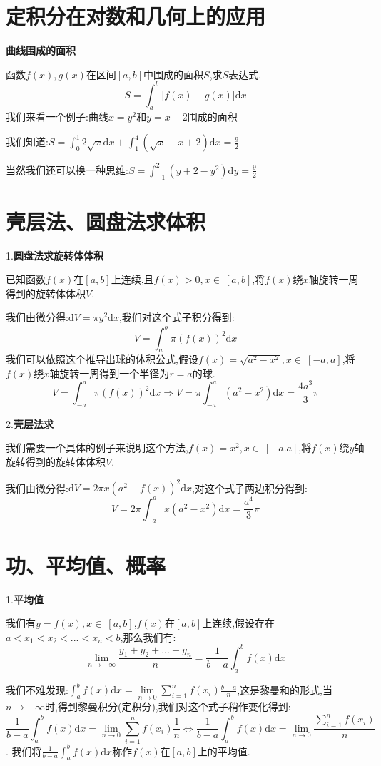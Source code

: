\documentclass[oneside]{book}
\begin{document}
	\chapter{定积分在对数和几何上的应用}
	\textbf{曲线围成的面积}
	
	函数$f(x),g(x)$在区间$[a,b]$中围成的面积$S$,求$S$表达式.
	$$S=\int_{a}^{b}|f(x)-g(x)|\mathrm{d}x$$
	我们来看一个例子:曲线$x=y^{2}$和$y=x-2$围成的面积
	
	我们知道:$S=\int_{0}^{1}2\sqrt{x}\mathrm{d}x+\int_{1}^{4}(\sqrt{x}-x+2)\mathrm{d}x=\frac{9}{2}$
	
	当然我们还可以换一种思维:$S=\int_{-1}^{2}(y+2-y^{2})\mathrm{d}y=\frac{9}{2}$
	\chapter{壳层法、圆盘法求体积}
	1.\textbf{圆盘法求旋转体体积}
	
	已知函数$f(x)$在$[a,b]$上连续,且$f(x)>0,x\in \ [a,b]$,将$f(x)$绕$x$轴旋转一周得到的旋转体体积$V$.
	
	我们由微分得:$\mathrm{d}V=\pi y^{2}\mathrm{d}x$,我们对这个式子积分得到:
	$$V=\int_{a}^{b}\pi (f(x))^{2}\mathrm{d}x$$
	我们可以依照这个推导出球的体积公式,假设$f(x)=\sqrt{a^{2}-x^{2}},x\in \ [-a,a]$,将$f(x)$绕$x$轴旋转一周得到一个半径为$r=a$的球.
	$$V=\int_{-a}^{a}\pi (f(x))^{2}\mathrm{d}x\Rightarrow V=\pi \int_{-a}^{a}(a^{2}-x^{2})\mathrm{d}x=\frac{4a^{3}}{3}\pi$$
	
	2.\textbf{壳层法求}
	
	我们需要一个具体的例子来说明这个方法,$f(x)=x^{2},x\in \ [-a.a]$,将$f(x)$绕$y$轴旋转得到的旋转体体积$V$.
	
	我们由微分得:$\mathrm{d}V=2\pi x(a^{2}-f(x))^{2}\mathrm{d}x$,对这个式子两边积分得到:
	$$V=2\pi\int_{-a}^{a}x(a^{2}-x^{2})\mathrm{d}x=\frac{a^{4}}{3}\pi$$
	\chapter{功、平均值、概率}
	1.\textbf{平均值}
	
	我们有$y=f(x),x\in\ [a,b]$,$f(x)$在$[a,b]$上连续,假设存在$a<x_{1}<x_{2}<...<x_{n}<b$,那么我们有:$$\lim\limits_{n\rightarrow +\infty}\frac{y_{1}+y_{2}+...+y_{n}}{n}=\frac{1}{b-a}\int_{a}^{b}f(x)\mathrm{d}x$$
	
	我们不难发现:$\int_{a}^{b}f(x)\mathrm{d}x=\lim\limits_{n\rightarrow 0}\sum_{i=1}^{n}f(x_{i})\frac{b-a}{n}$,这是黎曼和的形式,当$n\rightarrow +\infty$时,得到黎曼积分(定积分),我们对这个式子稍作变化得到:
	$$\frac{1}{b-a}\int_{a}^{b}f(x)\mathrm{d}x=\lim\limits_{n\rightarrow 0}\sum_{i=1}^{n}f(x_{i})\frac{1}{n}\Leftrightarrow \frac{1}{b-a}\int_{a}^{b}f(x)\mathrm{d}x=\lim\limits_{n\rightarrow 0}\frac{\sum_{i=1}^{n}f(x_{i})}{n}$$.
	我们将$\frac{1}{b-a}\int_{a}^{b}f(x)\mathrm{d}x$称作$f(x)$在$[a,b]$上的平均值.
	
\end{document}
